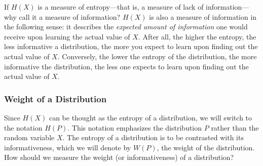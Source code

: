 \documentclass[
  10pt,
  dvipsnames,enabledeprecatedfontcommands]{scrartcl}
\begin{document}
If \(H(X)\) is a measure of entropy---that is, a measure of lack of
information---why call it a measure of information? \(H(X)\) is also a
measure of information in the following sense: it describes the
\textit{expected amount of information} one would receive upon learning
the actual value of \(X\). After all, the higher the entropy, the less
informative a distribution, the more you expect to learn upon finding
out the actual value of \(X\). Conversely, the lower the entropy of the
distribution, the more informative the distribution, the less one
expects to learn upon finding out the actual value of \(X\).

\hypertarget{weight-of-a-distribution}{%
\subsubsection{Weight of a
Distribution}\label{weight-of-a-distribution}}

Since \(H(X)\) can be thought as the entropy of a distribution, we will
switch to the notation \(H(P)\). This notation emphasizes the
distribution \(P\) rather than the random variable \(X\). The entropy of
a distribution is to be contrasted with its informativeness, which we
will denote by \(W(P)\), the weight of the distribution. How should we
measure the weight (or informativeness) of a distribution?

\end{document}
